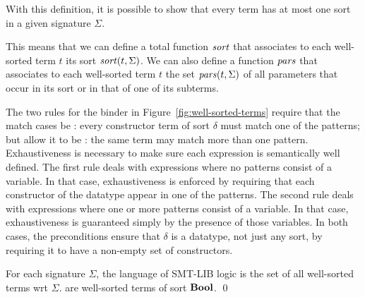 With this definition, it is possible to show that every term has at
most one sort in a given signature $\Sigma$.
\begin{newver}
This means that we can define a total function $\mathit{sort}$ that associates 
to each well-sorted term $t$ its sort $\mathit{sort}(t, \Sigma)$.
We can also define a function $\mathit{pars}$ that associates to each well-sorted term $t$
the set $\mathit{pars}(t, \Sigma)$ of all parameters that occur in its sort or in that 
of one of its subterms.
\end{newver}

\begin{remark}
The two rules for the  binder in Figure~\ref{fig:well-sorted-terms} 
require that the match cases be :
every constructor term of sort $\delta$ must match one of the patterns;
but allow it to be :
the same term may match more than one pattern.
Exhaustiveness is necessary to make sure each  expression is
semantically well defined.
The first rule deals with  expressions where no patterns consist 
of a variable.
In that case, exhaustiveness is enforced by requiring that each constructor
of the datatype appear in one of the patterns.
The second rule deals with  expressions where one or more patterns 
consist of a variable.
In that case, exhaustiveness is guaranteed simply by the presence 
of those variables.
In both cases, the preconditions ensure that $\delta$ is a datatype, 
not just any sort, by requiring it to have a non-empty set of constructors.
\end{remark}

\begin{definition}
For each signature $\Sigma$,
the language of SMT-LIB logic is the set of all well-sorted terms
wrt $\Sigma$.
 are well-sorted terms of sort $\textbf{Bool}$.
\qed
\end{definition}

